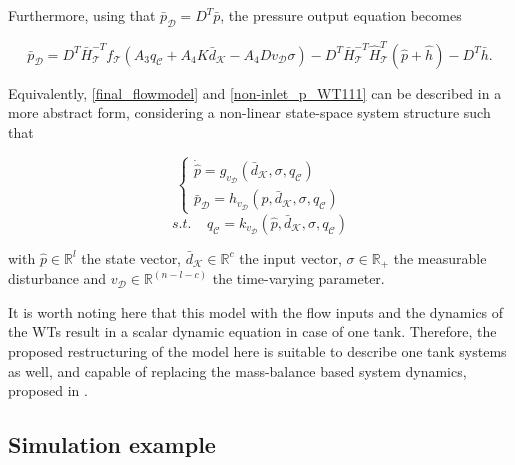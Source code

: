 Furthermore, using that $\bar{p}_{\mathcal{D}} = D^T \bar{p} $, the pressure output equation becomes

\begin{equation}
  \label{non-inlet_p_WT111}
  \bar{p}_{\mathcal{D}} = D^T \bar{H}^{-T}_{\mathcal{T}}f_{\mathcal{T}}(A_3 q_\mathcal{C} + A_4 K \bar{d}_{\mathcal{K}} - A_4 D v_{\mathcal{D}} \sigma) - D^T\bar{H}^{-T}_{\mathcal{T}}\hat{H}^{T}_{\mathcal{T}} (\hat{p} + \hat{h}) - D^T\bar{h} .
\end{equation}

Equivalently, \eqref{final_flowmodel} and \eqref{non-inlet_p_WT111} can be described in a more abstract form, considering a non-linear state-space system structure such that

\begin{equation}
\label{final_flowmodel_abstract}
\begin{cases}
    \dot{\hat{p}} = g_{v_{\mathcal{D}}}( \bar{d}_{\mathcal{K}}, \sigma, q_\mathcal{C})\\
    \bar{p}_{\mathcal{D}} = h_{v_{\mathcal{D}}}(\hat{p}, \bar{d}_{\mathcal{K}}, \sigma, q_\mathcal{C})
\end{cases}
\end{equation}
\begin{equation*}
s.t. \:\:\:\:\: q_\mathcal{C} = k_{v_{\mathcal{D}}}(\hat{p}, \bar{d}_{\mathcal{K}}, \sigma, q_\mathcal{C})
\end{equation*}

with $\hat{p} \in \mathbb{R}^{l}$ the state vector, $\bar{d}_{\mathcal{K}} \in \mathbb{R}^{c}$ the input vector, $\sigma \in \mathbb{R}_{+}$ the measurable disturbance and $v_{\mathcal{D}} \in \mathbb{R}^{(n-l-c)}$ the time-varying parameter. 

It is worth noting here that this model with the flow inputs and the dynamics of the WTs result in a scalar dynamic equation in case of one tank. Therefore, the proposed restructuring of the model here is suitable to describe one tank systems as well, and capable of replacing the mass-balance based system dynamics, proposed in . 


\subsection{Simulation example}
\label{simulation_example2}


